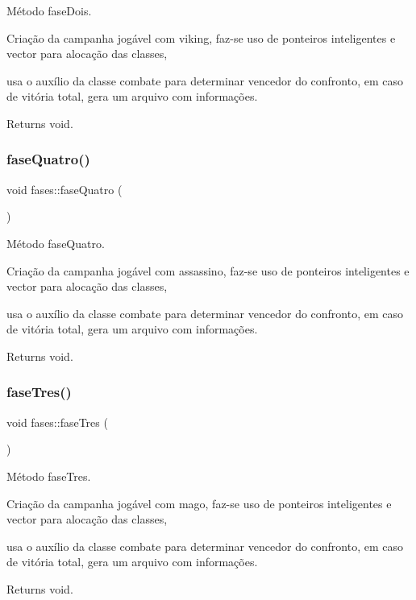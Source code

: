 Método fase\+Dois. 

Criação da campanha jogável com viking, faz-\/se uso de ponteiros inteligentes e vector para alocação das classes,

usa o auxílio da classe combate para determinar vencedor do confronto, em caso de vitória total, gera um arquivo com informações. \begin{DoxyReturn}{Returns}
void. 
\end{DoxyReturn}
\mbox{\label{classfases_af33d3aefdf442b1ea726645b0c946d78}} 
\subsubsection{\texorpdfstring{fase\+Quatro()}{faseQuatro()}}
{\footnotesize\ttfamily void fases\+::fase\+Quatro (\begin{DoxyParamCaption}{ }\end{DoxyParamCaption})}



Método fase\+Quatro. 

Criação da campanha jogável com assassino, faz-\/se uso de ponteiros inteligentes e vector para alocação das classes,

usa o auxílio da classe combate para determinar vencedor do confronto, em caso de vitória total, gera um arquivo com informações. \begin{DoxyReturn}{Returns}
void. 
\end{DoxyReturn}
\mbox{\label{classfases_a05138769008d5c7d1b548916ecfa9f34}} 
\subsubsection{\texorpdfstring{fase\+Tres()}{faseTres()}}
{\footnotesize\ttfamily void fases\+::fase\+Tres (\begin{DoxyParamCaption}{ }\end{DoxyParamCaption})}



Método fase\+Tres. 

Criação da campanha jogável com mago, faz-\/se uso de ponteiros inteligentes e vector para alocação das classes,

usa o auxílio da classe combate para determinar vencedor do confronto, em caso de vitória total, gera um arquivo com informações. \begin{DoxyReturn}{Returns}
void. 
\end{DoxyReturn}
\mbox{\label{classfases_a89059232b76460277f9846fc6d66488c}} 
